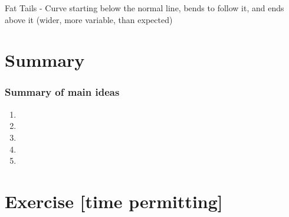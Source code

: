 \documentclass[slidestop,compress,mathserif,12pt,t,professionalfonts,xcolor=table]{beamer}
\begin{document}
\begin{frame}
\pause
{}
{
Fat Tails - Curve starting below the normal line, bends to follow it, and ends above it (wider, more variable, than expected)
}

\end{frame}


\section{Summary}


\begin{frame}
\frametitle{Summary of main ideas}

\vfill

\begin{enumerate}

\item {}

\item {}

\item {}

\item {}

\item {}

\end{enumerate}

\vfill

\end{frame}


\section{Exercise [time permitting]}
\end{document}
